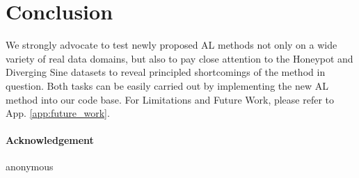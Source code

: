 \documentclass[]{article}
\begin{document}
\section{Conclusion}
We strongly advocate to test newly proposed AL methods not only on a wide variety of real data domains, but also to pay close attention to the Honeypot and Diverging Sine datasets to reveal principled shortcomings of the method in question.
Both tasks can be easily carried out by implementing the new AL method into our code base.
For Limitations and Future Work, please refer to App. \ref{app:future_work}.


\newpage
\paragraph{Acknowledgement}
anonymous




 

\newpage
\end{document}

